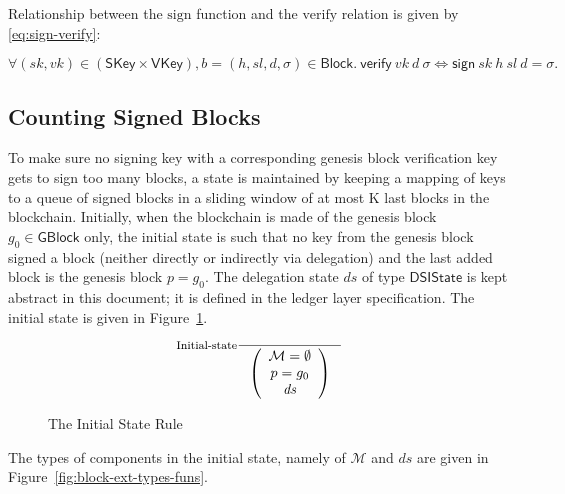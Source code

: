 \documentclass[11pt,a4paper]{article}
\newcommand{\var}[1]{\mathit{#1}}
\newcommand{\fun}[1]{\mathsf{#1}}
\newcommand{\type}[1]{\mathsf{#1}}
\newcommand{\GBlock}{\type{GBlock}}
\newcommand{\Block}{\type{Block}}
\newcommand{\SKey}{\type{SKey}}
\newcommand{\VKey}{\type{VKey}}
\newcommand{\DelegState}{\type{DSIState}}
\newcommand{\signname}{sign}
\newcommand{\verifyname}{verify}
\newcommand{\signmapname}{\mathcal{M}}
\newcommand{\sign}[4]{\fun{\signname}\ #1 ~ #2 ~ #3 ~ #4}
\newcommand{\verify}[3]{\fun{\verifyname} ~ #1 ~ #2 ~ #3}
\begin{document}
Relationship between the $\text{\signname}$ function and the
$\text{\verifyname}$ relation is given by \eqref{eq:sign-verify}:

\begin{equation}
  \label{eq:sign-verify}
  \forall (sk, vk) \in (\SKey \times \VKey), b = (h, sl, d, \sigma) \in \Block.\
  \verify{vk}{d}{\sigma} \iff \sign{sk}{h}{sl}{d} = \sigma.
\end{equation}


\subsection{Counting Signed Blocks}
\label{sec:counting-signed-blocks}

To make sure no signing key with a corresponding genesis block verification
key gets to sign too many blocks, a state is maintained by keeping a mapping
of keys to a queue of signed blocks in a sliding window of at most K last
blocks in the blockchain.
%
Initially, when the blockchain is made of the genesis block $g_0 \in \GBlock$
only, the initial state is such that no key from the genesis block signed a
block (neither directly or indirectly via delegation) and the last added block
is the genesis block $p = g_0$.
%
The delegation state $ds$ of type $\DelegState$ is kept abstract in this
document;
%
it is defined in the ledger layer specification.
%
The initial state is given in Figure~\ref{fig:init-bc-state}.

\begin{figure}
  \begin{equation*}
    \inference[Initial-state]
    {}
    {\left(
        {\begin{array}{c}
           \signmapname = \emptyset \\
           p = g_0 \\
           \var{ds}
         \end{array}}
     \right)
   }
 \end{equation*}
 \caption{The Initial State Rule}
 \label{fig:init-bc-state}
\end{figure}

The types of components in the initial state, namely of $\fun{\signmapname}$
and $\var{ds}$ are given in Figure~\ref{fig:block-ext-types-funs}.
\end{document}
